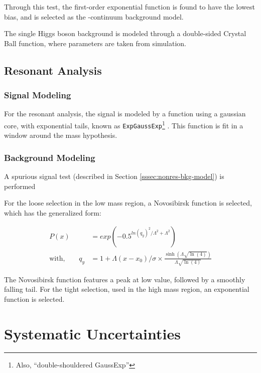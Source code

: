 Through this test, the first-order exponential function is found to have the lowest bias, and is selected as the \yy-continuum background model.

The single Higgs boson background is modeled through a double-sided Crystal Ball function, where parameters are taken from simulation.

\subsection{Resonant Analysis}
\subsubsection{Signal Modeling}

For the resonant analysis, the signal is modeled by a function using a gaussian core, with exponential tails, known as \texttt{ExpGaussExp}\footnote{Also, ``double-shouldered GaussExp''} \cite{exp-gauss-exp}. This function is fit in a window around the mass hypothesis. %


\subsubsection{Background Modeling} \label{sssec:res-bkg-model}

A spurious signal test (described in Section \ref{sssec:nonres-bkg-model}) is performed

For the loose selection in the low mass region, a Novosibirsk function \cite{novosibirsk} is selected, which has the generalized form:

\begin{equation}
  \begin{split}
  P(x) &= exp(-0.5^{ln(q_y)^2 / \Lambda^2 + \Lambda^2})\\
  \text{with,} \quad \quad q_{y} &= 1 + \Lambda(x-x_0)/\sigma \times \frac{\sinh(\Lambda \sqrt{\ln(4)})}{\Lambda \sqrt{\ln(4)}}
  \end{split}
\end{equation}

The Novosibirsk function features a peak at low value, followed by a smoothly falling tail. For the tight selection, used in the high mass region, an exponential function is selected.

\section{Systematic Uncertainties}

